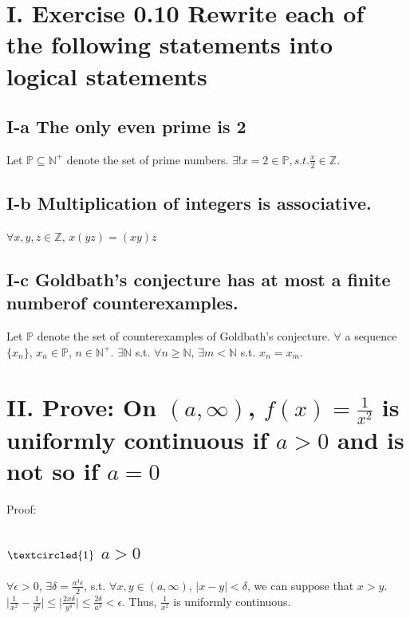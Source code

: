 \documentclass[twoside,a4paper]{article}
\begin{document}
\pagestyle{fancy}
\fancyhead{}


\section*{I. Exercise 0.10 \small{Rewrite each of the following statements into logical statements}}

\subsection*{I-a \small{The only even prime is 2}}
Let $\mathbb{P} \subseteq \mathbb{N}^+$ denote the set of prime numbers. 
$\exists! x = 2 \in \mathbb{P}, s.t. \frac{x}{2} \in \mathbb{Z}.$ 

\subsection*{I-b \small{Multiplication of integers is associative.}}
$\forall x,y,z \in \mathbb{Z}$, $x(yz)=(xy)z$

\subsection*{I-c \small{Goldbath's conjecture has at most a finite numberof counterexamples.}}
Let $\mathbb{P}$ denote the set of counterexamples of Goldbath's conjecture.
$\forall$ a sequence $\{ x_{n} \}$, $x_{n} \in \mathbb{P}$, $n \in \mathbb{N}^+$.
$\exists \mathbb{N}$ s.t. $\forall n \geq \mathbb{N}$, $\exists m < \mathbb{N}$ s.t. $x_{n} = x_{m}$.  

\section*{II. \small{Prove: On $(a, \infty)$, $f(x)=\frac{1}{x^2}$ is uniformly continuous if $a>0$ and is not so if $a=0$  } }
Proof:

\subsection*{\small{$\textcircled{1}$ $a>0$}}
$\forall \epsilon > 0$, $\exists \delta = \frac{a^{3}\epsilon}{2}$, s.t. $\forall x, y \in (a, \infty)$, $\mid x - y \mid < \delta$, we can suppose that $x > y$.
$\mid\frac{1}{x^2} - \frac{1}{y^2}\mid \leq \mid\frac{2x\delta}{y^4}\mid \leq \frac{2\delta}{a^3} < \epsilon$.
Thus, $\frac{1}{x^2}$ is uniformly continuous.
\end{document}
